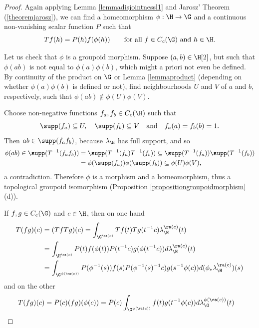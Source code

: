\begin{proof}
Again applying Lemma \ref{lemmadisjointnessl1} and Jarosz' Theorem (\ref{theoremjarosz}), we can find a homeomorphism $\phi:\H\to\G$ and a continuous non-vanishing scalar function $P$ such that
\[Tf(h)=P(h) f(\phi(h))\qquad\text{for all } f\in C_c(\G)\text{ and }h\in\H.\]

Let us check that $\phi$ is a groupoid morphism. Suppose $(a,b)\in\H[2]$, but such that $\phi(ab)$ is not equal to $\phi(a)\phi(b)$, which might a priori not even be defined. By continuity of the product on $\G$ or Lemma \ref{lemmaproduct} (depending on whether $\phi(a)\phi(b)$ is defined or not), find neighbourhoods $U$ and $V$ of $a$ and $b$, respectively, such that $\phi(ab)\not\in\phi(U)\phi(V)$.

Choose non-negative functions $f_a,f_b\in C_c(\H)$ such that
\[\supp(f_a)\subseteq U,\quad\supp(f_b)\subseteq V\quad\text{and}\quad f_a(a)=f_b(b)=1.\]
Then $ab\in\supp(f_af_b)$, because $\lambda_{\H}$ has full support, and so
\begin{align*}
\phi(ab)\in\supp(T^{-1}(f_af_b))&=\supp(T^{-1}(f_a)T^{-1}(f_b))\subseteq\supp(T^{-1}(f_a))\supp(T^{-1}(f_b))\\
&=\phi(\supp(f_a))\phi(\supp(f_b))\subseteq \phi(U)\phi(V),
\end{align*}
a contradiction. Therefore $\phi$ is a morphism and a homeomorphism, thus a topological groupoid isomorphism (Proposition \ref{propositiongroupoidmorphism}(d)).

If $f,g\in C_c(\G)$ and $c\in\H$, then on one hand
\begin{align*}
T(fg)(c)&=(TfTg)(c)=\int_{\G^{\ra(c)}} Tf(t)Tg(t^{-1}c)\lambda_{\H}^{\ra(c)}(t)\\
&=\int_{\H^{\ra(c)}} P(t)f(\phi(t))P(t^{-1}c)g(\phi(t^{-1}c))d\lambda_{\H}^{\ra(c)}(t)\\
&=\int_{\G^{\phi(\ra(c))}} P(\phi^{-1}(s))f(s)P(\phi^{-1}(s)^{-1}c)g(s^{-1}\phi(c))d(\phi_*\lambda_{\H}^{\ra(c)})(s)
\end{align*}
and on the other
\begin{align*}
T(fg)(c)&=P(c)(fg)(\phi(c))=P(c)\int_{\G^{\phi(\ra(c))}} f(t)g(t^{-1}\phi(c))d\lambda_{\G}^{\phi(\ra(c))}(t)
\end{align*}


\end{proof}
